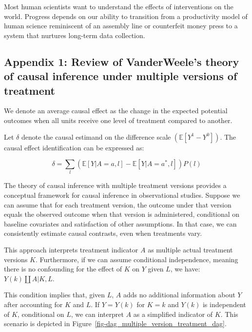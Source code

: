 \documentclass[
  singlecolumn]{article}
\begin{document}
Most human scientists want to understand the effects of interventions on
the world. Progress depends on our ability to transition from a
productivity model of human science reminiscent of an assembly line or
counterfeit money press to a system that nurtures long-term data
collection.

\newpage{}

\hypertarget{appendix-1-review-of-vanderweeles-theory-of-causal-inference-under-multiple-versions-of-treatment}{%
\subsection{Appendix 1: Review of VanderWeele's theory of causal
inference under multiple versions of
treatment}\label{appendix-1-review-of-vanderweeles-theory-of-causal-inference-under-multiple-versions-of-treatment}}

We denote an average causal effect as the change in the expected
potential outcomes when all units receive one level of treatment
compared to another.

Let \(\delta\) denote the causal estimand on the difference scale
\((\mathbb{E}[Y^1 - Y^0])\). The causal effect identification can be
expressed as:

\[ \delta = \sum_l \left( \mathbb{E}[Y|A=a,l] - \mathbb{E}[Y|A=a^*,l] \right) P(l)\]

The theory of causal inference with multiple treatment versions provides
a conceptual framework for causal inference in observational studies.
Suppose we can assume that for each treatment version, the outcome under
that version equals the observed outcome when that version is
administered, conditional on baseline covariates and satisfaction of
other assumptions. In that case, we can consistently estimate causal
contrasts, even when treatments vary.

This approach interprets treatment indicator \(A\) as multiple actual
treatment versions \(K\). Furthermore, if we can assume conditional
independence, meaning there is no confounding for the effect of \(K\) on
\(Y\) given \(L\), we have: \(Y(k)\coprod A|K,L\).

This condition implies that, given \(L\), \(A\) adds no additional
information about \(Y\) after accounting for \(K\) and \(L\). If
\(Y = Y(k)\) for \(K = k\) and \(Y(k)\) is independent of \(K\),
conditional on \(L\), we can interpret \(A\) as a simplified indicator
of \(K\). This scenario is depicted in
Figure~\ref{fig-dag_multiple_version_treatment_dag}.
\end{document}
